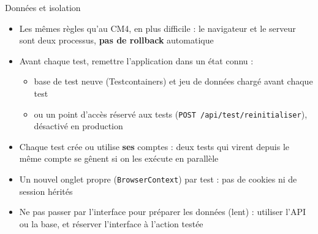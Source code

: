 \documentclass[aspectratio=169,10pt]{beamer}
\begin{document}
\begin{frame}{Données et isolation}
  \begin{itemize}
    \item Les mêmes règles qu'au CM4, en plus difficile : le navigateur et le serveur sont deux processus, \textbf{pas de rollback} automatique
    \item Avant chaque test, remettre l'application dans un état connu :
      \begin{itemize}
        \item base de test neuve (Testcontainers) et jeu de données chargé avant chaque test
        \item ou un point d'accès réservé aux tests (\texttt{POST /api/test/reinitialiser}), désactivé en production
      \end{itemize}
    \item Chaque test crée ou utilise \textbf{ses} comptes : deux tests qui virent depuis le même compte se gênent si on les exécute en parallèle
    \item Un nouvel onglet propre (\texttt{BrowserContext}) par test : pas de cookies ni de session hérités
    \item Ne pas passer par l'interface pour préparer les données (lent) : utiliser l'API ou la base, et réserver l'interface à l'action testée
  \end{itemize}
\end{frame}
\end{document}
